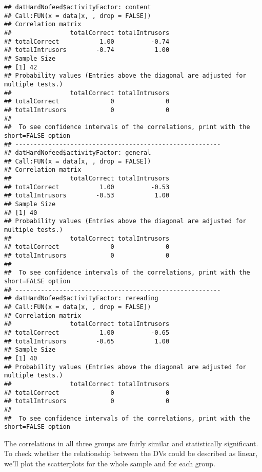 \documentclass[12pt,]{article}
\begin{document}
\begin{verbatim}
## datHardNofeed$activityFactor: content
## Call:FUN(x = data[x, , drop = FALSE])
## Correlation matrix 
##                totalCorrect totalIntrusors
## totalCorrect           1.00          -0.74
## totalIntrusors        -0.74           1.00
## Sample Size 
## [1] 42
## Probability values (Entries above the diagonal are adjusted for multiple tests.) 
##                totalCorrect totalIntrusors
## totalCorrect              0              0
## totalIntrusors            0              0
## 
##  To see confidence intervals of the correlations, print with the short=FALSE option
## -------------------------------------------------------- 
## datHardNofeed$activityFactor: general
## Call:FUN(x = data[x, , drop = FALSE])
## Correlation matrix 
##                totalCorrect totalIntrusors
## totalCorrect           1.00          -0.53
## totalIntrusors        -0.53           1.00
## Sample Size 
## [1] 40
## Probability values (Entries above the diagonal are adjusted for multiple tests.) 
##                totalCorrect totalIntrusors
## totalCorrect              0              0
## totalIntrusors            0              0
## 
##  To see confidence intervals of the correlations, print with the short=FALSE option
## -------------------------------------------------------- 
## datHardNofeed$activityFactor: rereading
## Call:FUN(x = data[x, , drop = FALSE])
## Correlation matrix 
##                totalCorrect totalIntrusors
## totalCorrect           1.00          -0.65
## totalIntrusors        -0.65           1.00
## Sample Size 
## [1] 40
## Probability values (Entries above the diagonal are adjusted for multiple tests.) 
##                totalCorrect totalIntrusors
## totalCorrect              0              0
## totalIntrusors            0              0
## 
##  To see confidence intervals of the correlations, print with the short=FALSE option
\end{verbatim}

The correlations in all three groups are fairly similar and
statistically significant. To check whether the relationship between the
DVs could be described as linear, we'll plot the scatterplots for the
whole sample and for each group.
\end{document}
